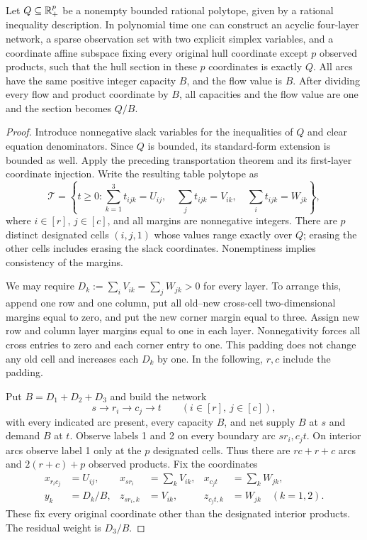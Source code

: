 \begin{theorem}\label{thm:universality}
Let $Q\subseteq\mathbb R_+^p$ be a nonempty bounded rational polytope, given by a
rational inequality description. In polynomial time one can construct an
acyclic four-layer network, a sparse observation set with two explicit
simplex variables, and a coordinate affine subspace fixing every original hull
coordinate except $p$ observed products, such that the hull section in
these $p$ coordinates is exactly $Q$. All arcs have the same positive
integer capacity $B$, and the flow value is $B$.
After dividing every flow and product coordinate by $B$, all capacities
and the flow value are one and the section becomes $Q/B$.
\end{theorem}
\begin{proof}
Introduce nonnegative slack variables for the inequalities of $Q$ and
clear equation denominators. Since $Q$ is bounded, its standard-form
extension is bounded as well. Apply the preceding transportation theorem
and its first-layer coordinate injection. Write the resulting table
polytope as
\begin{equation}\label{eq:universal-table}
 \mathcal T=\left\{t\ge0:
 \sum_{k=1}^3t_{ijk}=U_{ij},\quad
 \sum_jt_{ijk}=V_{ik},\quad
 \sum_it_{ijk}=W_{jk}\right\},
\end{equation}
where $i\in[r]$, $j\in[c]$, and all margins are nonnegative integers.
There are $p$ distinct designated cells $(i,j,1)$ whose values range
exactly over $Q$; erasing the other cells includes erasing the slack
coordinates. Nonemptiness implies consistency of the margins.

We may require $D_k:=\sum_iV_{ik}=\sum_jW_{jk}>0$ for every layer.
To arrange this, append one row and one column, put all old--new cross-cell
two-dimensional margins equal to zero, and put the new corner margin
equal to three. Assign new row and column layer margins equal to one
in each layer. Nonnegativity forces all cross entries to zero and each
corner entry to one. This padding does not change any old cell and
increases each $D_k$ by one. In the following, $r,c$ include the padding.

Put $B=D_1+D_2+D_3$ and build the network
\[
 s\longrightarrow r_i\longrightarrow c_j\longrightarrow t
 \qquad(i\in[r],\ j\in[c]),
\]
with every indicated arc present, every capacity $B$, and net supply
$B$ at $s$ and demand $B$ at $t$. Observe labels 1 and 2 on every
boundary arc $sr_i,c_jt$. On interior arcs observe label 1 only at
the $p$ designated cells. Thus there are $rc+r+c$ arcs and
$2(r+c)+p$ observed products. Fix the coordinates
\begin{align*}
 x_{r_ic_j}&=U_{ij},&
 x_{sr_i}&=\sum_kV_{ik},&x_{c_jt}&=\sum_kW_{jk},\\
 y_k&=D_k/B,&
 z_{sr_i,k}&=V_{ik},&z_{c_jt,k}&=W_{jk}\quad(k=1,2).
\end{align*}
These fix every original coordinate other than the designated interior
products. The residual weight is $D_3/B$.


\end{proof}
